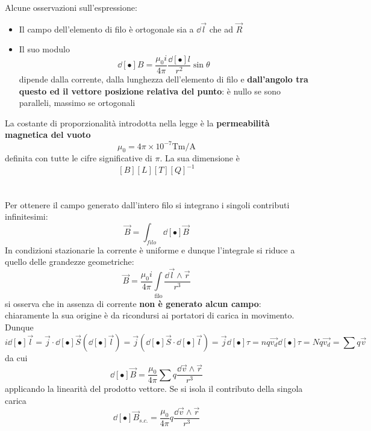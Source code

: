 
Alcune osservazioni sull'espressione:

\begin{itemize}
\item Il campo dell'elemento di filo è ortogonale sia a $\dd{\vec{l}}$ che ad $\vec{R}$
\item Il suo modulo 
\[\dd[•]{B} = \frac{\mu_0 i}{4 \pi} \frac{\dd[•]{l}}{r^2} \sin \theta\]
dipende dalla corrente, dalla lunghezza dell'elemento di filo e \textbf{dall'angolo tra questo ed il vettore posizione relativa del punto}: è nullo se sono paralleli, massimo se ortogonali
\end{itemize}

La costante di proporzionalità introdotta nella legge è la \textbf{permeabilità magnetica del vuoto}
\[\mu_0 = 4 \pi \times 10^{-7} \mathrm{Tm/A}\]
definita con tutte le cifre significative di $\pi$. La sua dimensione è
\[[B] [L] [T] [Q]^{-1}\]
\, \\~\\
Per ottenere il campo generato dall'intero filo si integrano i singoli contributi infinitesimi:
\[\vec{B} = \int_{filo} \dd[•]{\vec{B}}\]
In condizioni stazionarie la corrente è uniforme e dunque l'integrale si riduce a quello delle grandezze geometriche:
\[\vec{B} = \frac{\mu_0 i}{4 \pi} \int\limits_{\textrm{filo}} \frac{\dd{\vec{l}} \wedge \vec{r}}{r^3}\]
si osserva che in assenza di corrente \textbf{non è generato alcun campo}: chiaramente la sua origine è da ricondursi ai portatori di carica in movimento. Dunque
\[i \dd[•]{\vec{l}} = \vec{j} \cdot \dd[•]{\vec{S}} (\dd[•]{\vec{l}}) = \vec{j} (\dd[•]{\vec{S}} \cdot \dd[•]{\vec{l}}) = \vec{j} \dd[•]{\tau} = n q \vec{v_d} \dd[•]{\tau} = N q \vec{v_d} = \sum q \vec{v}\]
da cui 
\[\dd[•]{\vec{B}} = \frac{\mu_0}{4 \pi} \sum q \frac{\dd{\vec{v}} \wedge \vec{r}}{r^3}\]
applicando la linearità del prodotto vettore. Se si isola il contributo della singola carica
\[\dd[•]{\vec{B}}_{s. c.} = \frac{\mu_0}{4 \pi} q \frac{\dd{\vec{v}} \wedge \vec{r}}{r^3}\]

